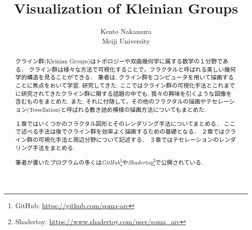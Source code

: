 \documentclass[dvipdfmx]{article}
\title{ Visualization of Kleinian Groups }
\author{ Kento Nakamura\\
Meiji University\\
}
\date{}
\begin{document}
\maketitle

\begin{abstract}
クライン群(Kleinian Groups)はトポロジーや双曲幾何学に属する数学の１分野である．
クライン群は様々な方法で可視化することで，フラクタルと呼ばれる美しい幾何学的構造を見ることができる．
筆者は, クライン群をコンピュータを用いて描画することに焦点をおいて学習, 研究してきた.
ここではクライン群の可視化手法とこれまでに研究されてきたクライン群に関する話題の中でも, 我々の興味を引くような図像を含むものをまとめた.
また, それに付随して，その他のフラクタルの描画やテセレーション(Tessellation)と呼ばれる敷き詰め模様の描画方法についてもまとめた.

１章ではいくつかのフラクタル図形とそのレンダリング手法についてまとめる．
ここで述べる手法は後でクライン群を効率よく描画するための基礎となる．
２章ではクライン群の可視化手法と周辺分野について記述する．
３章ではテセレーションのレンダリング手法をまとめる.

筆者が書いたプログラムの多くは\textit{GitHub}\footnote{GitHub: \url{https://github.com/soma-arc}}や\textit{Shadertoy}\footnote{Shadertoy: \url{https://www.shadertoy.com/user/soma\_arc}}で公開されている.

\end{abstract}

\tableofcontents








\end{document}
